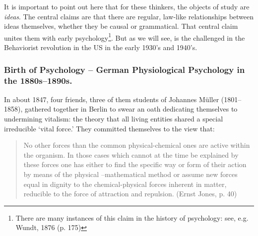 It is important to point out here that for these thinkers, the objects of study are \emph{ideas}. The central claims are that there are regular, law-like relationships between ideas themselves, whether they be causal or grammatical. That central claim unites them with early psychology\footnote{There are many instances of this claim in the history of psychology: see, e.g. Wundt, 1876 (p. 175)}. But as we will see, is the challenged in the Behaviorist revolution in the US in the early 1930’s and 1940’s.

\subsubsection{Birth of Psychology – German Physiological Psychology in the 1880s--1890s.}
\label{birthofpsychology–germanphysiologicalpsychologyinthe1880s-1890s.}

In about 1847, four friends, three of them students of Johannes Müller (1801--1858), gathered together in Berlin to swear an oath dedicating themselves to undermining vitalism: the theory that all living entities shared a special irreducible ‘vital force.’ They committed themselves to the view that:

\begin{quote}

No other forces than the common physical-chemical ones are active within the organism. In those cases which cannot at the time be explained by these forces one has either to find the specific way or form of their action by means of the physical –mathematical method or assume new forces equal in dignity to the chemical-physical forces inherent in matter, reducible to the force of attraction and repulsion. (Ernst Jones, p. 40)
\end{quote}

